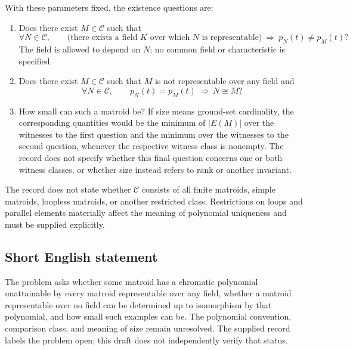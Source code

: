 \documentclass[11pt]{article}
\begin{document}
With these parameters fixed, the existence questions are:
\begin{enumerate}
\item Does there exist \(M\in\mathcal{C}\) such that
\[
 \forall N\in\mathcal{C},\qquad
 \bigl(\text{there exists a field }K\text{ over which }N\text{ is representable}\bigr)
 \ \Longrightarrow\ p_N(t)\ne p_M(t)?
\]
The field is allowed to depend on \(N\); no common field or characteristic is specified.
\item Does there exist \(M\in\mathcal{C}\) such that \(M\) is not representable over any field and
\[
 \forall N\in\mathcal{C},\qquad p_N(t)=p_M(t)\ \Longrightarrow\ N\cong M?
\]
\item How small can such a matroid be? If size means ground-set cardinality, the corresponding quantities would be the minimum of \(|E(M)|\) over the witnesses to the first question and the minimum over the witnesses to the second question, whenever the respective witness class is nonempty. The record does not specify whether this final question concerns one or both witness classes, or whether size instead refers to rank or another invariant.
\end{enumerate}
The record does not state whether \(\mathcal{C}\) consists of all finite matroids, simple matroids, loopless matroids, or another restricted class. Restrictions on loops and parallel elements materially affect the meaning of polynomial uniqueness and must be supplied explicitly.
\subsection{Short English statement}
The problem asks whether some matroid has a chromatic polynomial unattainable by every matroid representable over any field, whether a matroid representable over no field can be determined up to isomorphism by that polynomial, and how small such examples can be. The polynomial convention, comparison class, and meaning of size remain unresolved. The supplied record labels the problem open; this draft does not independently verify that status.
\end{document}
